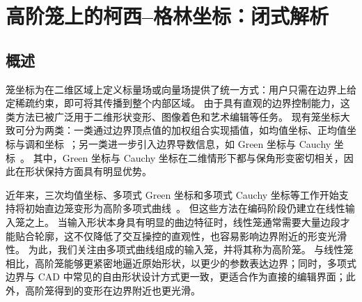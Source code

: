 \chapter{高阶笼上的柯西–格林坐标：闭式解析}

\providecommand{\Bezier}{B\'{e}zier }
\providecommand{\tr}[1]{#1}
\providecommand{\tb}[1]{#1}
\providecommand{\todo}[1]{}
\providecommand{\argmin}{\mathop{\mathrm{arg\,min}}\limits}
\providecommand{\argmax}{\mathop{\mathrm{arg\,max}}\limits}
\providecommand{\res}{\mathop{\mathrm{Res}}}
\providecommand{\re}{\mathop{\mathrm{Re}}}
\providecommand{\im}{\mathop{\mathrm{Im}}}

\makeatletter
{}
\makeatother

\def \ma {\mathbf{a}}
\def \me {\mathbf{e}}
\def \mb {\mathbf{b}}
\def \mc {\mathbf{c}}
\def \md {\mathbf{d}}
\def \mf {\mathbf{f}}
\def \mg {\mathbf{g}}
\def \mh {\mathbf{h}}
\def \mi {\mathbf{i}}
\def \mj {\mathbf{j}}
\def \mk {\mathbf{k}}
\def \ml {\mathbf{l}}
\def \mm {\mathbf{m}}
\def \mn {\mathbf{n}}
\def \mo {\mathbf{o}}
\def \mp {\mathbf{p}}
\def \mq {\mathbf{q}}
\def \mr {\mathbf{r}}
\def \ms {\mathbf{s}}
\def \mt {\mathbf{t}}
\def \muu {\mathbf{u}}
\def \mv {\mathbf{v}}
\def \mw {\mathbf{w}}
\def \mx {\mathbf{x}}
\def \my {\mathbf{y}}
\def \mz {\mathbf{z}}

\section{概述}\label{sec:chap4-overview}
笼坐标为在二维区域上定义标量场或向量场提供了统一方式：用户只需在边界上给定稀疏约束，即可将其传播到整个内部区域。
由于具有直观的边界控制能力，这类方法已被广泛用于二维形状变形、图像着色和艺术编辑等任务。
现有笼坐标大致可分为两类：一类通过边界顶点值的加权组合实现插值，如均值坐标、正均值坐标与调和坐标~\cite{Floater2003,Hormann2006,Lipman2007,Joshi2007}；另一类进一步引入边界导数信息，如 Green 坐标与 Cauchy 坐标~\cite{Lipman2008,Weber2009}。
其中，Green 坐标与 Cauchy 坐标在二维情形下都与保角形变密切相关，因此在形状保持方面具有明显优势。

近年来，三次均值坐标、多项式 Green 坐标和多项式 Cauchy 坐标等工作开始支持将初始直边笼变形为高阶多项式曲线~\cite{Li2013,MichelThiery2023,Lin2024PolynomialCC}。
但这些方法在编码阶段仍建立在线性输入笼之上。
当输入形状本身具有明显的曲边特征时，线性笼通常需要大量边段才能贴合轮廓，这不仅降低了交互操控的直观性，也容易影响边界附近的形变光滑性。
为此，我们关注由多项式曲线组成的输入笼，并将其称为高阶笼。
与线性笼相比，高阶笼能够更紧密地逼近原始形状，以更少的参数表达边界；同时，多项式边界与 CAD 中常见的自由形状设计方式更一致，更适合作为直接的编辑界面；此外，高阶笼得到的变形在边界附近也更光滑。


